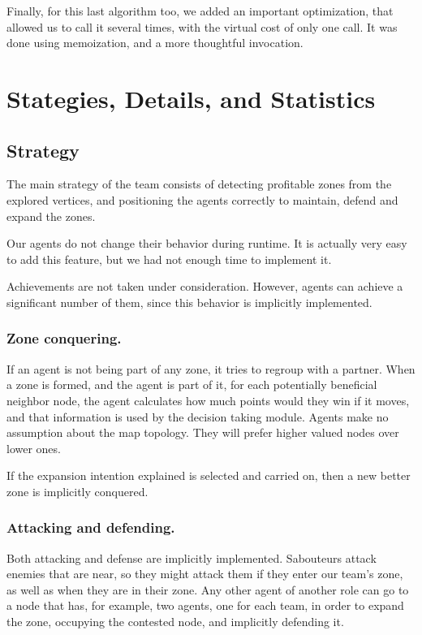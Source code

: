 \documentclass{llncs2e/llncs}
\begin{document}
    Finally, for this last algorithm too, we added an important optimization, 
    that allowed us to call it several times, with the virtual cost of only one 
    call. It was done using memoization, and a more thoughtful invocation.

\section{Stategies, Details, and Statistics}

\subsection{Strategy}
    The main strategy of the team consists of detecting profitable zones from the 
    explored vertices, and positioning the agents correctly to maintain, defend 
    and expand the zones. 
    
    Our agents do not change their behavior during runtime. It is actually very 
    easy to add this feature, but we had not enough time to implement it.
    
    Achievements are not taken under consideration. However, agents can
    achieve a significant number of them, since this behavior is implicitly 
    implemented.
    
\subsubsection{Zone conquering.}
    
    If an agent is not being part of any zone, it tries to regroup with a partner. 
    When a zone is formed, and the agent is part of it, for each potentially 
    beneficial neighbor node, the agent calculates how much points would they win 
    if it moves, and that information is used by the decision taking module.
    Agents make no assumption about the map topology. They will prefer higher 
    valued nodes over lower ones.

    If the expansion intention explained is selected and carried on, then a new 
    better zone is implicitly conquered.

\subsubsection{Attacking and defending.}
    
    Both attacking and defense are implicitly implemented. Sabouteurs attack 
    enemies that are near, so they might attack them if they enter our team's 
    zone, as well as when they are in their zone. Any other agent of another role
    can go to a node that has, for example, two agents, one for each team, in order
    to expand the zone, occupying the contested node, and implicitly defending it.
    
\end{document}
